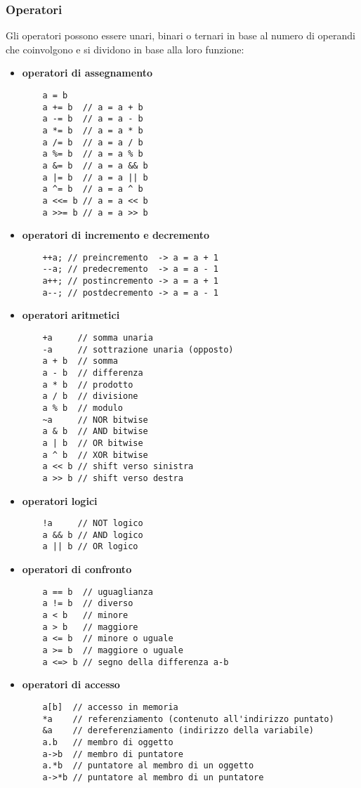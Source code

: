 \documentclass[a4paper]{article}
\begin{document}
\subsubsection*{Operatori}
Gli operatori possono essere unari, binari o ternari in base al numero di operandi che coinvolgono e si dividono in base alla
loro funzione:
\begin{itemize}
\item \textbf{operatori di assegnamento}
\begin{lstlisting}
	a = b
	a += b  // a = a + b
	a -= b  // a = a - b
	a *= b  // a = a * b
	a /= b  // a = a / b
	a %= b  // a = a % b
	a &= b  // a = a && b
	a |= b  // a = a || b
	a ^= b  // a = a ^ b
	a <<= b // a = a << b
	a >>= b // a = a >> b
\end{lstlisting}

\item \textbf{operatori di incremento e decremento}
\begin{lstlisting}
	++a; // preincremento  -> a = a + 1
	--a; // predecremento  -> a = a - 1
	a++; // postincremento -> a = a + 1
	a--; // postdecremento -> a = a - 1
\end{lstlisting}

\item \textbf{operatori aritmetici}
\begin{lstlisting}
	+a     // somma unaria
	-a     // sottrazione unaria (opposto)
	a + b  // somma
	a - b  // differenza
	a * b  // prodotto
	a / b  // divisione
	a % b  // modulo
	~a     // NOR bitwise
	a & b  // AND bitwise
	a | b  // OR bitwise
	a ^ b  // XOR bitwise
	a << b // shift verso sinistra
	a >> b // shift verso destra
\end{lstlisting}

\item \textbf{operatori logici}
\begin{lstlisting}
	!a     // NOT logico
	a && b // AND logico
	a || b // OR logico
\end{lstlisting}

\item \textbf{operatori di confronto}
\begin{lstlisting}
	a == b  // uguaglianza
	a != b  // diverso
	a < b   // minore
	a > b   // maggiore
	a <= b  // minore o uguale
	a >= b  // maggiore o uguale
	a <=> b // segno della differenza a-b
\end{lstlisting}

\newpage

\item \textbf{operatori di accesso}
\begin{lstlisting}
	a[b]  // accesso in memoria
	*a    // referenziamento (contenuto all'indirizzo puntato)
	&a    // dereferenziamento (indirizzo della variabile)
	a.b   // membro di oggetto
	a->b  // membro di puntatore
	a.*b  // puntatore al membro di un oggetto
	a->*b // puntatore al membro di un puntatore
\end{lstlisting}


\end{itemize}
\end{document}
